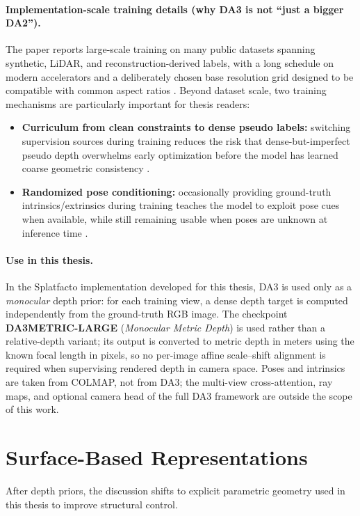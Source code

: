 \paragraph{Implementation-scale training details (why DA3 is not ``just a bigger DA2'').}
The paper reports large-scale training on many public datasets spanning synthetic, LiDAR, and reconstruction-derived labels, with a long schedule on modern accelerators and a deliberately chosen base resolution grid designed to be compatible with common aspect ratios \cite{lin2025depthanything3}. Beyond dataset scale, two training mechanisms are particularly important for thesis readers:
\begin{itemize}
    \item \textbf{Curriculum from clean constraints to dense pseudo labels:} switching supervision sources during training reduces the risk that dense-but-imperfect pseudo depth overwhelms early optimization before the model has learned coarse geometric consistency \cite{lin2025depthanything3}.
    \item \textbf{Randomized pose conditioning:} occasionally providing ground-truth intrinsics/extrinsics during training teaches the model to exploit pose cues when available, while still remaining usable when poses are unknown at inference time \cite{lin2025depthanything3}.
\end{itemize}



\paragraph{Use in this thesis.}
In the Splatfacto implementation developed for this thesis, DA3 is used only as a \emph{monocular} depth prior: for each training view, a dense depth target is computed independently from the ground-truth RGB image. The checkpoint \textbf{DA3METRIC-LARGE} (\emph{Monocular Metric Depth}) is used rather than a relative-depth variant; its output is converted to metric depth in meters using the known focal length in pixels, so no per-image affine scale--shift alignment is required when supervising rendered depth in camera space. Poses and intrinsics are taken from COLMAP, not from DA3; the multi-view cross-attention, ray maps, and optional camera head of the full DA3 framework are outside the scope of this work.



\section{Surface-Based Representations}
After depth priors, the discussion shifts to explicit parametric geometry used in this thesis to improve structural control.

